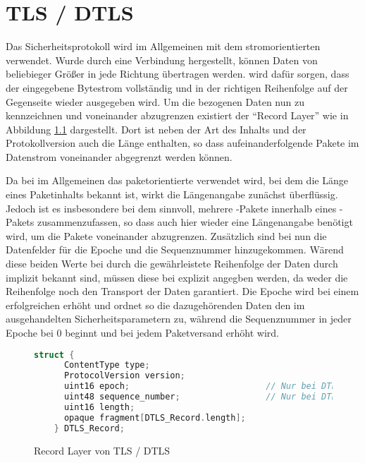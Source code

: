 \chapter{TLS / DTLS}

Das Sicherheitsprotokoll  wird im Allgemeinen mit dem stromorientierten  verwendet.
Wurde durch  eine Verbindung hergestellt, können Daten von beliebieger Größer in jede Richtung
übertragen werden.  wird dafür sorgen, dass der eingegebene Bytestrom vollständig und in der
richtigen Reihenfolge auf der Gegenseite wieder ausgegeben wird. Um die  bezogenen Daten nun
zu kennzeichnen und voneinander abzugrenzen existiert der "`Record Layer"' wie in Abbildung \ref{fig:recordlayer}
dargestellt.  Dort ist neben der Art des Inhalts und der Protokollversion auch
die Länge enthalten, so dass aufeinanderfolgende Pakete im Datenstrom voneinander abgegrenzt werden können.

Da bei  im Allgemeinen das paketorientierte  verwendet wird, bei dem die Länge eines
Paketinhalts bekannt ist, wirkt die Längenangabe zunächst überflüssig. Jedoch ist es insbesondere bei dem
 sinnvoll, mehrere -Pakete innerhalb eines -Pakets zusammenzufassen,
so dass auch hier wieder eine Längenangabe benötigt wird, um die Pakete voneinander abzugrenzen.
Zusätzlich sind bei  nun die Datenfelder für die Epoche und die Sequenznummer hinzugekommen.
Wärend diese beiden Werte bei  durch die gewährleistete Reihenfolge der Daten durch 
implizit bekannt sind, müssen diese bei  explizit angegben werden, da  weder die
Reihenfolge noch den Transport der Daten garantiert. Die Epoche wird bei einem erfolgreichen 
erhöht und ordnet so die dazugehörenden Daten den im  ausgehandelten Sicherheitsparametern zu,
während die Sequenznummer in jeder Epoche bei 0 beginnt und bei jedem Paketversand erhöht wird.

\begin{figure}[ht]
  \centering
  \begin{lstlisting}[language=c]
    struct {
      ContentType type;
      ProtocolVersion version;
      uint16 epoch;                           // Nur bei DTLS
      uint48 sequence_number;                 // Nur bei DTLS
      uint16 length;
      opaque fragment[DTLS_Record.length];
    } DTLS_Record;
  \end{lstlisting}
  \caption{Record Layer von TLS / DTLS}
  \label{fig:recordlayer}
\end{figure}




